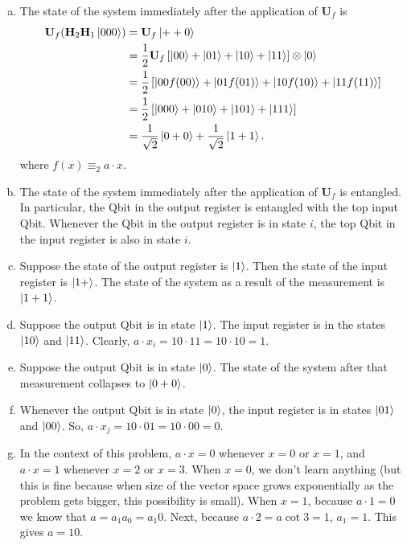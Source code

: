 \documentclass{book}
\theoremstyle{definition}
\newcommand{\nn}{\nonumber}
\newcommand{\f}[2]{\frac{#1}{#2}}
\newcommand{\lb}{\left[}
\newcommand{\rb}{\right]}
\newcommand{\U}{\mathbf{U}}
\newcommand{\had}{\mathbf{H}}
\begin{document}
\begin{enumerate}[(a)]
	\item The state of the system immediately after the application of $\U_f$ is 
	\begin{align}
	\U_f (\had_2\had_1 \ket{000}) 
	&= \U_f \ket{++0} \nn\\
	&= \f{1}{2}\U_f \lb \ket{00} + \ket{01} + \ket{10}+ \ket{11} \rb \otimes \ket{0}\nn\\
	&= \f{1}{2}\lb \ket{00f(00)} + \ket{01f(01)} + \ket{10f(10)}+ \ket{11f(11)}  \rb\nn\\
	&= \f{1}{2} \lb \ket{000} + \ket{010} + \ket{101} + \ket{111} \rb\nn\\
	&= \f{1}{\sqrt{2}} \ket{0 + 0} + \f{1}{\sqrt{2}} \ket{1 + 1} .
	\end{align}
	where $f(x) \equiv_2 a\cdot x$.
	
	\item  The state of the system immediately after the application of $\U_f$ is entangled. In particular, the Qbit in the output register is entangled with the top input Qbit. Whenever the Qbit in the output register is in state $i$, the top Qbit in the input register is also in state $i$.
	
	\item Suppose the state of the output register is $\ket{1}$. Then the state of the input register is $\ket{1+}$. The state of the system as a result of the measurement is $\ket{1+1}$. 
	
	\item Suppose the output Qbit is in state $\ket{1}$. The input register is in the states $\ket{10}$ and $\ket{11}$. Clearly, $a\cdot x_i = 10 \cdot 11 = 10 \cdot 10 = 1$.  
	
	\item Suppose the output Qbit is in state $\ket{0}$. The state of the system after that measurement collapses to $\ket{0 + 0}$. 
	
	
	\item Whenever the output Qbit is in state $\ket{0}$, the input register is in states $\ket{01}$ and $\ket{00}$. So, $a\cdot x_j = 10 \cdot 01 = 10 \cdot 00 = 0$.  
	
	\item In the context of this problem, $a \cdot x = 0$ whenever $x = 0$ or $x = 1$, and $a \cdot x=  1$ whenever $x = 2$ or $x=3$. When $x=0$, we don't learn anything (but this is fine because when size of the vector space grows exponentially as the problem gets bigger, this possibility is small). When $x=1$, because $a \cdot 1 = 0$ we know that $a = a_1 a_0 = a_1 0$. Next, because $a \cdot 2 = a \cot 3 = 1$, $a_1 = 1$. This gives $a = 10$. 
\end{enumerate}
\end{document}
